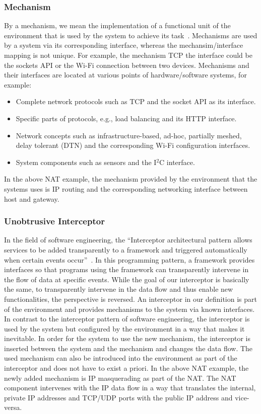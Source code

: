 \subsubsection{Mechanism}
By a mechanism, we mean the implementation of a functional unit of the environment that is used by the system to achieve its task~\cite{frommgen2016mechanism}.
Mechanisms are used by a system via its corresponding interface, whereas the mechansim/interface mapping is not unique.
For example, the mechanism TCP the interface could be the sockets API or the Wi-Fi connection between two devices.
Mechanisms and their interfaces are located at various points of hardware/software systems, for example:
%
\begin{itemize}
 \item Complete network protocols such as TCP and the socket API as its interface.
 \item Specific parts of protocols, e.g., load balancing and its HTTP interface.
 \item Network concepts such as infrastructure-based, ad-hoc, partially meshed, delay tolerant (DTN) and the corresponding Wi-Fi configuration interfaces.
 \item System components such as sensors and the I$^2$C interface.
\end{itemize}
%
In the above NAT example, the mechanism provided by the environment that the systems uses is IP routing and the corresponding networking interface between host and gateway.


\subsubsection{Unobtrusive Interceptor}
In the field of software engineering, the ``Interceptor architectural pattern allows services to be added transparently to a framework and triggered automatically when certain events occur''~\cite{schmidt2013pattern}.
In this programming pattern, a framework provides interfaces so that programs using the framework can transparently intervene in the flow of data at specific events.
While the goal of our interceptor is basically the same, to transparently intervene in the data flow and thus enable new functionalities, the perspective is reversed.
An interceptor in our definition is part of the environment and provides mechanisms to the system via known interfaces. 
In contrast to the interceptor pattern of software engineering, the interceptor is used by the system but configured by the environment in a way that makes it inevitable.
In order for the system to use the new mechanism, the interceptor is inserted between the system and the mechanism and changes the data flow.
The used mechanism can also be introduced into the environment as part of the interceptor and does not have to exist a priori.
In the above NAT example, the newly added mechanism is IP masquerading as part of the NAT.
The NAT component intervenes with the IP data flow in a way that translates the internal, private IP addresses and TCP/UDP ports with the public IP address and vice-versa.

